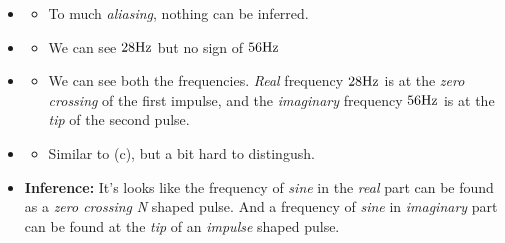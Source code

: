 \documentclass[../../course]{subfiles}
\begin{document}
\begin{itemize} [label=]

    \item \sampFreqMuchLess
        \begin{itemize} [label=]
            \item To much \emph{aliasing}, nothing can be inferred.
        \end{itemize}

    \item \sampFreqNorm
        \begin{itemize} [label=]
            \item We can see $\freqXOne \si{Hz}$ but no sign of $\freqXTwo \si{Hz}$
        \end{itemize}

    \item \sampFreqSligGreat
        \begin{itemize} [label=]
            \item We can see both the frequencies. \emph{Real} frequency $\freqXOne \si{Hz}$
                is at the \emph{zero crossing} of the first impulse, and the \emph{imaginary}
                frequency $\freqXTwo \si{Hz}$ is at the \emph{tip} of the second pulse.
        \end{itemize}

    \item \sampFreqMuchGreat
        \begin{itemize} [label=]
            \item Similar to (c), but a bit hard to distingush.
        \end{itemize}

    \item \textbf{Inference:} It's looks like the frequency of \emph{sine} in the \emph{real}
        part can be found as a \emph{zero crossing} \emph{N} shaped pulse. And a frequency of \emph{sine}
        in \emph{imaginary} part can be found at the \emph{tip} of an \emph{impulse} shaped pulse.


\end{itemize}

\vfill
\end{document}
